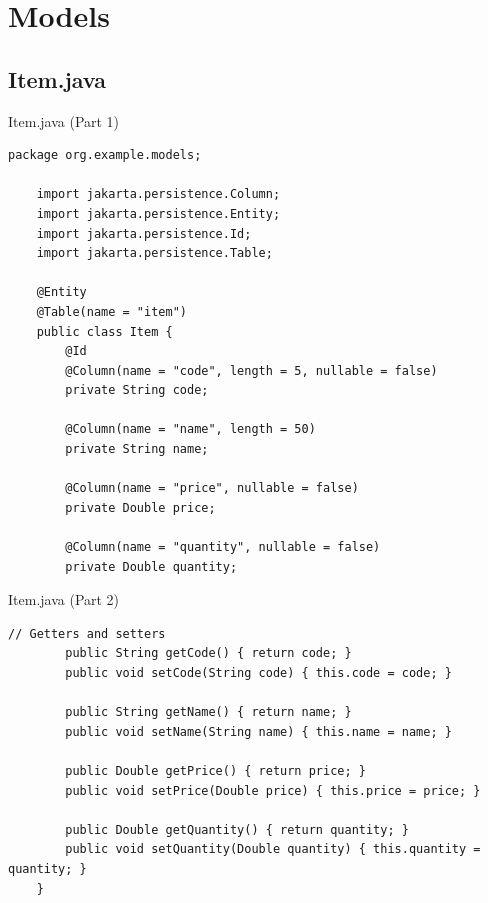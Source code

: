 \documentclass[aspectratio=169, table]{beamer}
\begin{document}
\section{Models}
\subsection{Item.java}
\begin{frame}[fragile]{Item.java (Part 1)}
\vspace{20pt}
\begin{lstlisting}[style=JavaStyle]
	package org.example.models;
	
	import jakarta.persistence.Column;
	import jakarta.persistence.Entity;
	import jakarta.persistence.Id;
	import jakarta.persistence.Table;
	
	@Entity
	@Table(name = "item")
	public class Item {
		@Id
		@Column(name = "code", length = 5, nullable = false)
		private String code;
		
		@Column(name = "name", length = 50)
		private String name;
		
		@Column(name = "price", nullable = false)
		private Double price;
		
		@Column(name = "quantity", nullable = false)
		private Double quantity;
	\end{lstlisting}
\end{frame}

\begin{frame}[fragile]{Item.java (Part 2)}
	\vspace{20pt}
	\begin{lstlisting}[style=JavaStyle]
		// Getters and setters
		public String getCode() { return code; }
		public void setCode(String code) { this.code = code; }
		
		public String getName() { return name; }
		public void setName(String name) { this.name = name; }
		
		public Double getPrice() { return price; }
		public void setPrice(Double price) { this.price = price; }
		
		public Double getQuantity() { return quantity; }
		public void setQuantity(Double quantity) { this.quantity = quantity; }
	}
\end{lstlisting}
\end{frame}
\end{document}
